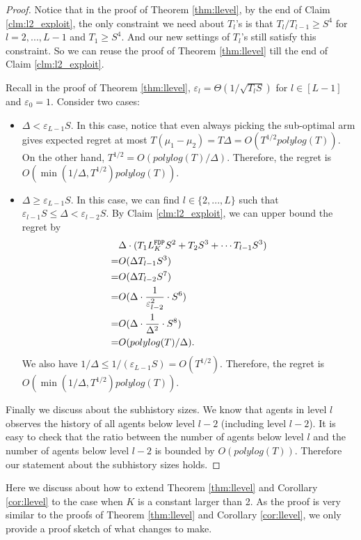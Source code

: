 \begin{proof}
Notice that in the proof of Theorem \ref{thm:llevel}, by the end of Claim \ref{clm:l2_exploit}, the only constraint we need about $T_l$'s is that $T_l / T_{l-1} \geq S^4$ for $l=2,...,L-1$ and $T_1 \geq S^4$. And our new settings of $T_l$'s still satisfy this constraint. So we can reuse the proof of Theorem \ref{thm:llevel} till the end of Claim \ref{clm:l2_exploit}.

Recall in the proof of Theorem \ref{thm:llevel}, $\varepsilon_l =\Theta(1/\sqrt{T_l S})$ for $l \in [L-1]$ and $\varepsilon_0 = 1$. Consider two cases:
\begin{itemize}
\item $\Delta < \varepsilon_{L-1} S$. In this case, notice that even always picking the sub-optimal arm gives expected regret at most $T(\mu_1-\mu_2) = T\Delta = O(T^{1/2} polylog(T))$. On the other hand, $T^{1/2} = O(polylog(T)/\Delta)$. Therefore, the regret is $O(\min(1/\Delta, T^{1/2})polylog(T))$.
\item $\Delta \geq \varepsilon_{L-1} S$. In this case, we can find $l \in \{2,...,L\}$ such that $\varepsilon_{l-1} S\leq \Delta < \varepsilon_{l-2} S$. By Claim \ref{clm:l2_exploit}, we can upper bound the regret by
\begin{align*}
&\Delta \cdot (T_1 L^\mathtt{FDP}_K S^2  +T_2 S^3+ \cdots T_{l-1} S^3)\\
=& O(\Delta T_{l-1}S^3) \\
=&O(\Delta T_{l-2}S^7) \\
=&O(\Delta\cdot  \frac{1}{\varepsilon^2_{l-2}}\cdot S^6)\\
=&O(\Delta \cdot \frac{1}{\Delta^2}\cdot S^8)\\
=&O(polylog(T)/\Delta).
\end{align*}
We also have $1/\Delta \leq 1/(\varepsilon_{L-1}S)= O(T^{1/2})$. Therefore, the regret is $O(\min(1/\Delta, T^{1/2})polylog(T))$.
\end{itemize}

Finally we discuss about the subhistory sizes. We know that agents in level $l$ observes the history of all agents below level $l-2$ (including level $l-2$). It is easy to check that the ratio between the number of agents below level $l$ and the number of agents below level $l-2$ is bounded by $O(polylog(T))$. Therefore our statement about the subhistory sizes holds.
\end{proof}

Here we discuss about how to extend Theorem \ref{thm:llevel} and Corollary \ref{cor:llevel} to the case when $K$ is a constant larger than 2. As the proof is very similar to the proofs of Theorem \ref{thm:llevel} and Corollary \ref{cor:llevel}, we only provide a proof sketch of what changes to make.

